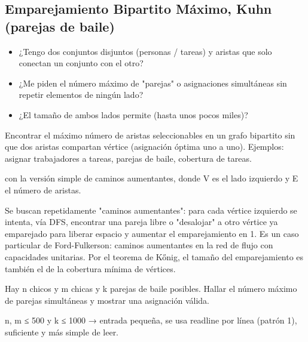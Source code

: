 \subsection{Emparejamiento Bipartito Máximo, Kuhn (parejas de baile)}
\label{alg:4-1}


\begin{itemize}
\item ¿Tengo dos conjuntos disjuntos (personas / tareas) y aristas que solo conectan un conjunto con el otro?
\item ¿Me piden el número máximo de "parejas" o asignaciones simultáneas sin repetir elementos de ningún lado?
\item ¿El tamaño de ambos lados permite  (hasta unos pocos miles)?
\end{itemize}

 Encontrar el máximo número de aristas seleccionables en un grafo bipartito sin que dos aristas compartan vértice (asignación óptima uno a uno). Ejemplos: asignar trabajadores a tareas, parejas de baile, cobertura de tareas.

  con la versión simple de caminos aumentantes, donde V es el lado izquierdo y E el número de aristas.

 Se buscan repetidamente "caminos aumentantes": para cada vértice izquierdo se intenta, vía DFS, encontrar una pareja libre o "desalojar" a otro vértice ya emparejado para liberar espacio y aumentar el emparejamiento en 1. Es un caso particular de Ford-Fulkerson: caminos aumentantes en la red de flujo con capacidades unitarias. Por el teorema de Kőnig, el tamaño del emparejamiento es también el de la cobertura mínima de vértices.~\cite{kuhn1955,hopcroft1973}


Hay n chicos y m chicas y k parejas de baile posibles. Hallar el número máximo de parejas simultáneas y mostrar una asignación válida.

 n, m ≤ 500 y k ≤ 1000 → entrada pequeña, se usa readline por línea (patrón 1), suficiente y más simple de leer.


